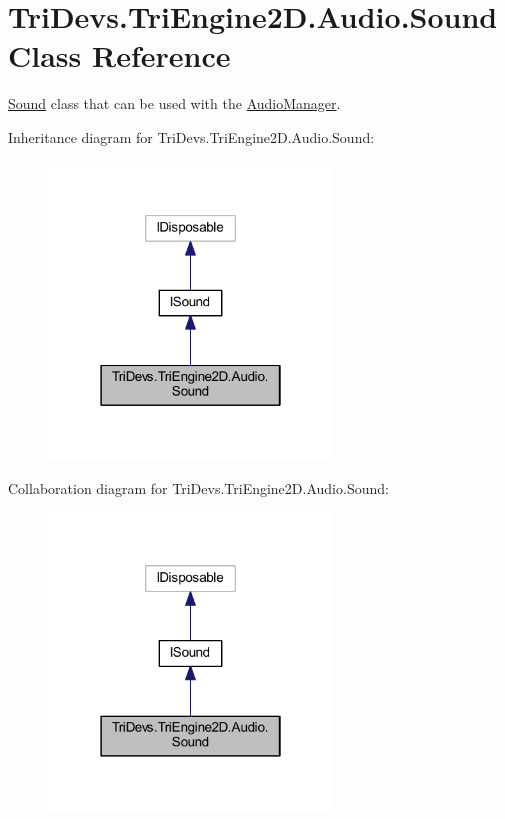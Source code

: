 \hypertarget{class_tri_devs_1_1_tri_engine2_d_1_1_audio_1_1_sound}{\section{Tri\-Devs.\-Tri\-Engine2\-D.\-Audio.\-Sound Class Reference}
\label{class_tri_devs_1_1_tri_engine2_d_1_1_audio_1_1_sound}
}


\hyperlink{class_tri_devs_1_1_tri_engine2_d_1_1_audio_1_1_sound}{Sound} class that can be used with the \hyperlink{class_tri_devs_1_1_tri_engine2_d_1_1_audio_1_1_audio_manager}{Audio\-Manager}.  




Inheritance diagram for Tri\-Devs.\-Tri\-Engine2\-D.\-Audio.\-Sound\-:
\nopagebreak
\begin{figure}[H]
\begin{center}
\leavevmode
\includegraphics[width=214pt]{class_tri_devs_1_1_tri_engine2_d_1_1_audio_1_1_sound__inherit__graph}
\end{center}
\end{figure}


Collaboration diagram for Tri\-Devs.\-Tri\-Engine2\-D.\-Audio.\-Sound\-:
\nopagebreak
\begin{figure}[H]
\begin{center}
\leavevmode
\includegraphics[width=214pt]{class_tri_devs_1_1_tri_engine2_d_1_1_audio_1_1_sound__coll__graph}
\end{center}
\end{figure}
